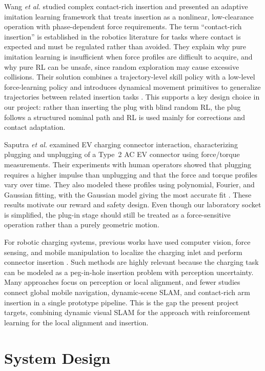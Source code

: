 \documentclass[10pt]{article}
\begin{document}
Wang \textit{et al.} studied complex contact-rich insertion and presented an adaptive imitation learning framework that treats insertion as a nonlinear, low-clearance operation with phase-dependent force requirements. The term ``contact-rich insertion'' is established in the robotics literature for tasks where contact is expected and must be regulated rather than avoided. They explain why pure imitation learning is insufficient when force profiles are difficult to acquire, and why pure RL can be unsafe, since random exploration may cause excessive collisions. Their solution combines a trajectory-level skill policy with a low-level force-learning policy and introduces dynamical movement primitives to generalize trajectories between related insertion tasks \cite{wang2022adaptive}. This supports a key design choice in our project: rather than inserting the plug with blind random RL, the plug follows a structured nominal path and RL is used mainly for corrections and contact adaptation.

Saputra \textit{et al.} examined EV charging connector interaction, characterizing plugging and unplugging of a Type~2 AC EV connector using force/torque measurements. Their experiments with human operators showed that plugging requires a higher impulse than unplugging and that the force and torque profiles vary over time. They also modeled these profiles using polynomial, Fourier, and Gaussian fitting, with the Gaussian model giving the most accurate fit \cite{saputra2025evft}. These results motivate our reward and safety design. Even though our laboratory socket is simplified, the plug-in stage should still be treated as a force-sensitive operation rather than a purely geometric motion.

For robotic charging systems, previous works have used computer vision, force sensing, and mobile manipulation to localize the charging inlet and perform connector insertion \cite{miseikis2017charging,rakhmatulin2024pose,zhou2021plug,guo2021visionforce,chablat2022charging}. Such methods are highly relevant because the charging task can be modeled as a peg-in-hole insertion problem with perception uncertainty. Many approaches focus on perception or local alignment, and fewer studies connect global mobile navigation, dynamic-scene SLAM, and contact-rich arm insertion in a single prototype pipeline. This is the gap the present project targets, combining dynamic visual SLAM for the approach with reinforcement learning for the local alignment and insertion.


\section{System Design}
\label{sec:system_design}
\end{document}

